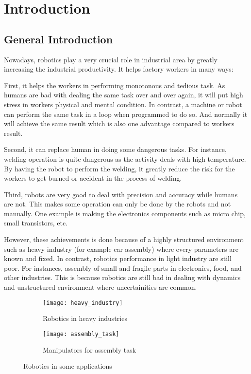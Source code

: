 \chapter{Introduction}
\section{General Introduction}

Nowadays, robotics play a very crucial role in industrial area by greatly increasing the industrial productivity. It helps factory workers in many ways:

First, it helps the workers in performing monotonous and tedious task. As humans are bad with dealing the same task over and over again, it will put high stress in workers physical and mental condition. In contrast, a machine or robot can perform the same task in a loop when programmed to do so. And normally it will achieve the same result which is also one advantage compared to workers result.

Second, it can replace human in doing some dangerous tasks. For instance, welding operation is quite dangerous as the activity deals with high temperature. By having the robot to perform the welding, it greatly reduce the risk for the workers to get burned or accident in the process of welding.

Third, robots are very good to deal with precision and accuracy while humans are not. This makes some operation can only be done by the robots and not manually. One example is making the electronics components such as micro chip, small transistors, etc. 

However, these achievements is done because of a highly structured environment such as heavy industry (for example car assembly) where every parameters are known and fixed. In contrast, robotics performance in light industry are still poor. For instances, assembly of small and fragile parts in electronics, food, and other industries. This is because robotics are still bad in dealing with dynamics and unstructured environment where uncertainities are common. 

\begin{figure}[h]
  \begin{subfigure}[t]{0.5\textwidth}
    \centering
    \texttt{[image: heavy\_industry]} 
    \caption{Robotics in heavy industries}
  \end{subfigure}
  \begin{subfigure}[t]{0.5\textwidth}
    \centering
    \texttt{[image: assembly\_task]}
    \caption{Manipulators for assembly task}
  \end{subfigure}
  \caption{Robotics in some applications}
\end{figure}



